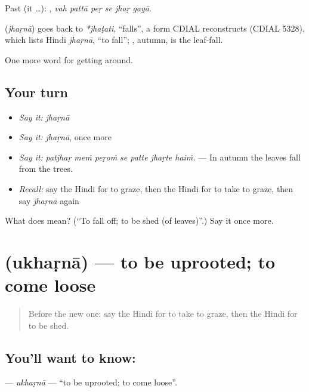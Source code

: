 Past (it …):      , \emph{vah pattā peṛ se jhaṛ gayā}.

\begin{cousinweb}
\textbf{} (\emph{jhaṛnā}) goes back to \emph{*jhaṭati}, \textquotedblleft{}falls\textquotedblright{}, a form CDIAL reconstructs (CDIAL 5328), which lists Hindi \emph{jhaṛnā}, \textquotedblleft{}to fall\textquotedblright{}; , autumn, is the leaf-fall.
\end{cousinweb}

\begin{grammarlens}[title={What you've built}]
One more word for getting around.
\end{grammarlens}

\subsection*{Your turn}
\begin{itemize}
\raggedright
  \item \emph{Say it:} \emph{jhaṛnā}
  \item \emph{Say it:} \emph{jhaṛnā}, once more
  \item \emph{Say it:} \emph{patjhaṛ meṁ peṛoṁ se patte jhaṛte haiṁ.} — In autumn the leaves fall from the trees.
  \item \emph{Recall:} say the Hindi for to graze, then the Hindi for to take to graze, then say \emph{jhaṛnā} again
\end{itemize}

\begin{tcolorbox}[breakable,colback=teal!4,colframe=teal!35!black,title={Before you move on}]
What does  mean? (\textquotedblleft{}To fall off; to be shed (of leaves)\textquotedblright{}.) Say it once more.
\end{tcolorbox}
\section[\texorpdfstring{\hi{उखड़ना} (ukhaṛnā)}{उखड़ना (ukhaṛnā)}]{ (ukhaṛnā) — to be uprooted; to come loose}

\label{lesson:HI-C450-ukharna}



\begin{quote}
Before the new one: say the Hindi for to take to graze, then the Hindi for to be shed.
\end{quote}

\subsection*{You'll want to know: }
\textbf{} — \emph{ukhaṛnā} — \textquotedblleft{}to be uprooted; to come loose\textquotedblright{}.


